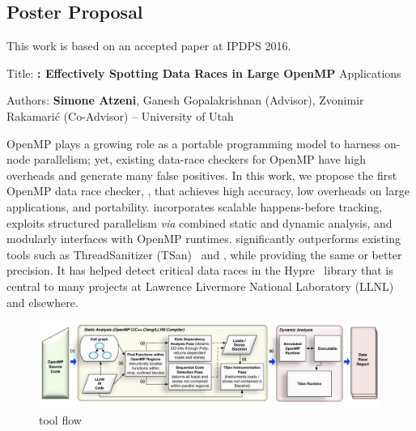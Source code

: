 \documentclass[svgnames,10pt]{article}
\begin{document}
\vspace{-5pt}
\subsection{Poster Proposal}
\vspace{-5pt}
This work is based on an accepted paper at IPDPS 2016.

Title: \textbf{\archer: Effectively Spotting Data Races in Large OpenMP}
Applications

Authors: \textbf{Simone Atzeni}, Ganesh Gopalakrishnan (Advisor),
Zvonimir Rakamari\'c (Co-Advisor) -- University of Utah

OpenMP plays a growing role as a portable programming model to harness
on-node parallelism; yet, existing data-race checkers for OpenMP have high
overheads and generate many false positives.
% 
In this work, we propose the first OpenMP data race checker, \archer, that
achieves high accuracy, low overheads on large applications, and
portability.
% 
\archer incorporates scalable happens-before tracking, exploits structured
parallelism \textit{via} combined static and dynamic analysis, and modularly
interfaces with OpenMP runtimes.
% 
\archer significantly outperforms existing tools such as
ThreadSanitizer (TSan)~\cite{tsan:2009,tsan} and \insp, while providing the same or
better precision.
% 
It has helped detect critical data races in the Hypre~\cite{hypre} library
that is central to many projects at Lawrence Livermore National Laboratory
(LLNL) and elsewhere.

\begin{figure}
  \includegraphics[width=\textwidth]{archerdiagram}
  \vspace{-20pt}
  \caption{\archer tool flow}
  \label{fig:archerdiagram}
  \vspace{-5pt}
\end{figure}
\end{document}
